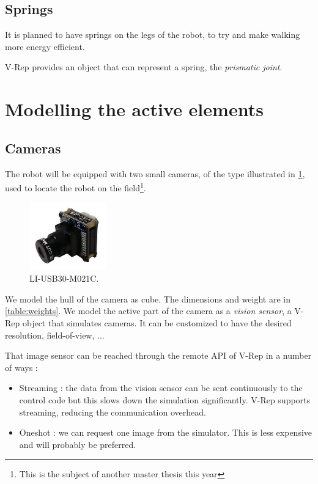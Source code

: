 \subsection{Springs}
It is planned to have springs on the legs of the robot, to try and make walking more energy efficient. 

V-Rep provides an object that can represent a spring, the \emph{prismatic joint}.

\section{Modelling the active elements}
\subsection{Cameras}
The robot will be equipped with two small cameras, of the type illustrated in \cref{fig:camera}, used to locate the robot on the field\footnote{This is the subject of another master thesis this year}. 

\begin{figure}[htp]
\center
    \includegraphics[width = 0.3\textwidth]{figures/li_cam}
    \caption[LI-USB30-M021C]{LI-USB30-M021C.}
    \label{fig:camera}
\end{figure}

We model the hull of the camera as cube. The dimensions and weight are in \cref{table:weights}. We model the active part of the camera as a \emph{vision sensor}, a V-Rep object that simulates cameras. It can be customized to have the desired resolution, field-of-view, ...

That image sensor can be reached through the remote API of V-Rep in a number of ways : \begin{itemize}
\item Streaming : the data from the vision sensor can be sent continuously to the control code but this slows down the simulation significantly. V-Rep supports streaming, reducing the communication overhead.
\item Oneshot : we can request one image from the simulator. This is less expensive and will probably be preferred.
\end{itemize} 

